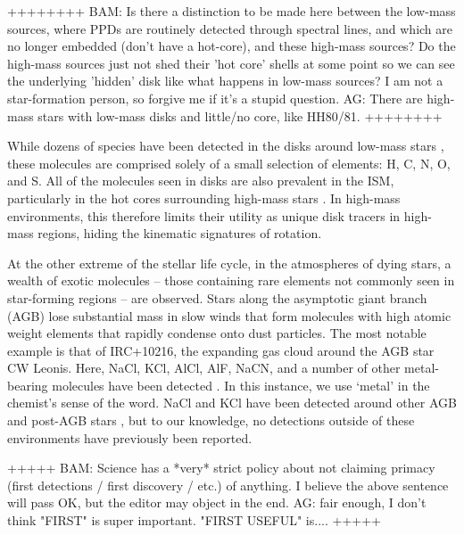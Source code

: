 \documentclass[12pt]{article}
\begin{document}
++++++++
BAM: Is there a distinction to be made here between the low-mass sources, where
PPDs are routinely detected through spectral lines, and which are no longer
embedded (don't have a hot-core), and these high-mass sources?  Do the
high-mass sources just not shed their 'hot core' shells at some point so we can
see the underlying 'hidden' disk like what happens in low-mass sources?  I am
not a star-formation person, so forgive me if it's a stupid question.
AG: There are high-mass stars with low-mass disks and little/no core, like
HH80/81.  
++++++++

While dozens of species have been detected in the disks around low-mass stars
\citep{McGuire2018c}, these molecules are comprised solely of a small selection
of elements: H, C, N, O, and S.  All of the molecules seen in disks are also
prevalent in the ISM, particularly in the hot cores surrounding high-mass stars
\citep{some sgr b2 reference}. In high-mass environments, this therefore
limits their utility as unique disk tracers in high-mass regions, hiding
the kinematic signatures of rotation.

At the other extreme of the stellar life cycle, in the atmospheres of dying
stars, a wealth of exotic molecules -- those containing rare elements not
commonly seen in star-forming regions -- are observed.  Stars along the
asymptotic giant branch (AGB) lose substantial mass in slow winds
\citep{Herwig2005a} that form molecules with high atomic weight elements that
rapidly condense onto dust particles.  The most notable example is that of
IRC+10216, the expanding gas cloud around the AGB star CW Leonis.  Here, NaCl,
KCl, AlCl, AlF, NaCN, and a number of other metal-bearing molecules have been
detected \citep{Agundez2012a,Zack2011a}.  In this instance, we use `metal' in
the chemist's sense of the word.  NaCl and KCl have been detected around other
AGB and post-AGB stars
\citep{Milam2007a,Highberger2003a,Sanchez-Contreras2018a}, but to our
knowledge, no detections outside of these environments have previously been
reported.

+++++ BAM: Science has a *very* strict policy about not claiming primacy (first
detections / first discovery / etc.) of anything.  I believe the above sentence
will pass OK, but the editor may object in the end.
AG: fair enough, I don't think "FIRST" is super important.  "FIRST USEFUL"
is....
+++++
\end{document}
